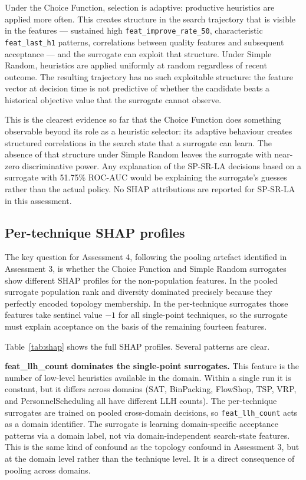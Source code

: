 \documentclass[11pt,a4paper]{article}
\begin{document}
Under the Choice Function, selection is adaptive: productive heuristics are applied
more often. This creates structure in the search trajectory that is visible in the
features --- sustained high \texttt{feat\_improve\_rate\_50}, characteristic
\texttt{feat\_last\_h1} patterns, correlations between quality features and subsequent
acceptance --- and the surrogate can exploit that structure. Under Simple Random,
heuristics are applied uniformly at random regardless of recent outcome. The resulting
trajectory has no such exploitable structure: the feature vector at decision time is
not predictive of whether the candidate beats a historical objective value that
the surrogate cannot observe.

This is the clearest evidence so far that the Choice Function does something
observable beyond its role as a heuristic selector: its adaptive behaviour creates
structured correlations in the search state that a surrogate can learn. The absence
of that structure under Simple Random leaves the surrogate with near-zero discriminative
power. Any explanation of the SP-SR-LA decisions based on a surrogate with 51.75\%
ROC-AUC would be explaining the surrogate's guesses rather than the actual policy. No
SHAP attributions are reported for SP-SR-LA in this assessment.

\subsection{Per-technique SHAP profiles}

The key question for Assessment 4, following the pooling artefact identified in
Assessment 3, is whether the Choice Function and Simple Random surrogates show
different SHAP profiles for the non-population features. In the pooled surrogate
population rank and diversity dominated precisely because they perfectly encoded
topology membership. In the per-technique surrogates those features take sentinel
value $-1$ for all single-point techniques, so the surrogate must explain acceptance
on the basis of the remaining fourteen features.

Table~\ref{tab:shap} shows the full SHAP profiles. Several patterns are clear.

\textbf{feat\_llh\_count dominates the single-point surrogates.} This feature is
the number of low-level heuristics available in the domain. Within a single run it
is constant, but it differs across domains (SAT, BinPacking, FlowShop, TSP, VRP, and
PersonnelScheduling all have different LLH counts). The per-technique surrogates are
trained on pooled cross-domain decisions, so \texttt{feat\_llh\_count} acts as a
domain identifier. The surrogate is learning domain-specific acceptance patterns via
a domain label, not via domain-independent search-state features. This is the same
kind of confound as the topology confound in Assessment 3, but at the domain level
rather than the technique level. It is a direct consequence of pooling across domains.
\end{document}
